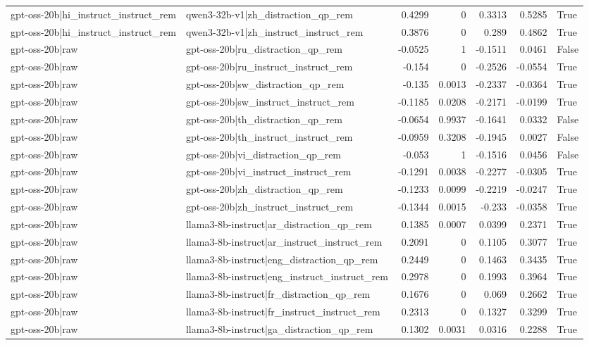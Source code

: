 \begin{table}
\begin{tabular}{l l r r r r l}
gpt-oss-20b|hi_instruct_instruct_rem & qwen3-32b-v1|zh_distraction_qp_rem & 0.4299 & 0 & 0.3313 & 0.5285 & True \\
gpt-oss-20b|hi_instruct_instruct_rem & qwen3-32b-v1|zh_instruct_instruct_rem & 0.3876 & 0 & 0.289 & 0.4862 & True \\
gpt-oss-20b|raw & gpt-oss-20b|ru_distraction_qp_rem & -0.0525 & 1 & -0.1511 & 0.0461 & False \\
gpt-oss-20b|raw & gpt-oss-20b|ru_instruct_instruct_rem & -0.154 & 0 & -0.2526 & -0.0554 & True \\
gpt-oss-20b|raw & gpt-oss-20b|sw_distraction_qp_rem & -0.135 & 0.0013 & -0.2337 & -0.0364 & True \\
gpt-oss-20b|raw & gpt-oss-20b|sw_instruct_instruct_rem & -0.1185 & 0.0208 & -0.2171 & -0.0199 & True \\
gpt-oss-20b|raw & gpt-oss-20b|th_distraction_qp_rem & -0.0654 & 0.9937 & -0.1641 & 0.0332 & False \\
gpt-oss-20b|raw & gpt-oss-20b|th_instruct_instruct_rem & -0.0959 & 0.3208 & -0.1945 & 0.0027 & False \\
gpt-oss-20b|raw & gpt-oss-20b|vi_distraction_qp_rem & -0.053 & 1 & -0.1516 & 0.0456 & False \\
gpt-oss-20b|raw & gpt-oss-20b|vi_instruct_instruct_rem & -0.1291 & 0.0038 & -0.2277 & -0.0305 & True \\
gpt-oss-20b|raw & gpt-oss-20b|zh_distraction_qp_rem & -0.1233 & 0.0099 & -0.2219 & -0.0247 & True \\
gpt-oss-20b|raw & gpt-oss-20b|zh_instruct_instruct_rem & -0.1344 & 0.0015 & -0.233 & -0.0358 & True \\
gpt-oss-20b|raw & llama3-8b-instruct|ar_distraction_qp_rem & 0.1385 & 0.0007 & 0.0399 & 0.2371 & True \\
gpt-oss-20b|raw & llama3-8b-instruct|ar_instruct_instruct_rem & 0.2091 & 0 & 0.1105 & 0.3077 & True \\
gpt-oss-20b|raw & llama3-8b-instruct|eng_distraction_qp_rem & 0.2449 & 0 & 0.1463 & 0.3435 & True \\
gpt-oss-20b|raw & llama3-8b-instruct|eng_instruct_instruct_rem & 0.2978 & 0 & 0.1993 & 0.3964 & True \\
gpt-oss-20b|raw & llama3-8b-instruct|fr_distraction_qp_rem & 0.1676 & 0 & 0.069 & 0.2662 & True \\
gpt-oss-20b|raw & llama3-8b-instruct|fr_instruct_instruct_rem & 0.2313 & 0 & 0.1327 & 0.3299 & True \\
gpt-oss-20b|raw & llama3-8b-instruct|ga_distraction_qp_rem & 0.1302 & 0.0031 & 0.0316 & 0.2288 & True \\

\end{tabular}
\end{table}
